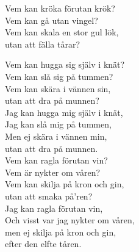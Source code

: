 \documentclass[a6paper, 10pt, twoside]{article}
\begin{document}
\newpage
\noindent
\begin{center}
\end{center}
\begin{lyrics}
Vem kan kröka förutan krök? \\
Vem kan gå utan vingel? \\
Vem kan skala en stor gul lök, \\
utan att fälla tårar? 
\end{lyrics}
\vspace{40pt}
\begin{center}
\end{center}
\begin{lyrics}
Vem kan hugga sig själv i knät? \\
Vem kan slå sig på tummen? \\
Vem kan skära i vännen sin, \\
utan att dra på munnen? 
\vspace{5pt}\\
Jag kan hugga mig själv i knät,\\
Jag kan slå mig på tummen, \\
Men ej skära i vännen min, \\
utan att dra på munnen. 
\vspace{5pt}\\
Vem kan ragla förutan vin? \\
Vem är nykter om våren? \\
Vem kan skilja på kron och gin, \\
utan att smaka på'ren? 
\vspace{5pt}\\
Jag kan ragla förutan vin, \\
Och visst var jag nykter om våren, \\
men ej skilja på kron och gin, \\
efter den elfte tåren.
\end{lyrics}
\end{document}
